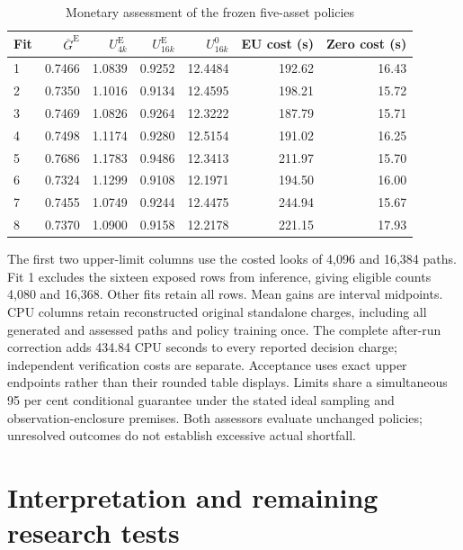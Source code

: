 \documentclass[11pt]{article}
\begin{document}
\begin{table}[!htbp]
\centering\small
\caption{Monetary assessment of the frozen five-asset policies}\label{tab:revision-multivariate-monetary}
\begin{tabular}{@{}lrrrrrr@{}}
\toprule
Fit & $\overline G^{\mathrm E}$ & $U^{\mathrm E}_{4k}$ & $U^{\mathrm E}_{16k}$ & $U^0_{16k}$ & EU cost (s) & Zero cost (s) \\
\midrule
1 & 0.7466 & 1.0839 & 0.9252 & 12.4484 & 192.62 & 16.43 \\
2 & 0.7350 & 1.1016 & 0.9134 & 12.4595 & 198.21 & 15.72 \\
3 & 0.7469 & 1.0826 & 0.9264 & 12.3222 & 187.79 & 15.71 \\
4 & 0.7498 & 1.1174 & 0.9280 & 12.5154 & 191.02 & 16.25 \\
5 & 0.7686 & 1.1783 & 0.9486 & 12.3413 & 211.97 & 15.70 \\
6 & 0.7324 & 1.1299 & 0.9108 & 12.1971 & 194.50 & 16.00 \\
7 & 0.7455 & 1.0749 & 0.9244 & 12.4475 & 244.94 & 15.67 \\
8 & 0.7370 & 1.0900 & 0.9158 & 12.2178 & 221.15 & 17.93 \\
\bottomrule
\end{tabular}
\par\smallskip\begin{minipage}{\textwidth}\footnotesize The first two upper-limit columns use the costed looks of 4,096 and 16,384 paths. Fit 1 excludes the sixteen exposed rows from inference, giving eligible counts 4,080 and 16,368. Other fits retain all rows. Mean gains are interval midpoints. CPU columns retain reconstructed original standalone charges, including all generated and assessed paths and policy training once. The complete after-run correction adds 434.84 CPU seconds to every reported decision charge; independent verification costs are separate. Acceptance uses exact upper endpoints rather than their rounded table displays. Limits share a simultaneous 95 per cent conditional guarantee under the stated ideal sampling and observation-enclosure premises. Both assessors evaluate unchanged policies; unresolved outcomes do not establish excessive actual shortfall.\end{minipage}
\end{table}

\section{Interpretation and remaining research tests}
\end{document}
